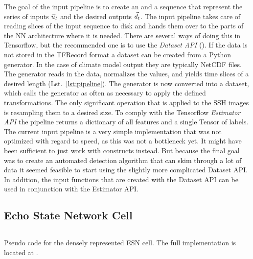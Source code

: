 The goal of the input pipeline is to create an  and a 
sequence that represent the series of inputs $\vec{u}_t$ and the desired outputs
$\vec{d}_t$.  The input pipeline takes care of reading slices of the input
sequence to disk and hands them over to the parts of the NN architecture where
it is needed.  There are several ways of doing this in Tensorflow, but the
recommended one is to use the \emph{Dataset API} ().  If
the data is not stored in the TFRecord format a dataset can be created from a
Python generator.  In the case of climate model output they are typically
NetCDF files.  The generator reads in the data, normalizes the values, and
yields time slices of a desired length (Lst.~\ref{lst:pipeline}).  The
generator is now converted into a dataset, which calls the generator as often
as necessary to apply the defined transformations.  The only significant
operation that is applied to the SSH images is resampling them to a desired
size.  To comply with the Tensorflow \emph{Estimator API} the pipeline returns
a dictionary of all features and a single Tensor of labels.  The current input
pipeline is a very simple implementation that was not optimized with regard
to speed, as this was not a bottleneck yet. It might have been sufficient to
just work with  constructs instead.  But because the final
goal was to create an automated detection algorithm that can skim through a lot
of data it seemed feasible to start using the slightly more complicated Dataset
API. In addition, the input functions that are created with the Dataset API can
be used in conjunction with the Estimator API.


\subsection{Echo State Network Cell}%
\label{sec:echo_state_network_cell}

\begin{listing}
  \inputminted{py}{pseudocode/esn_cell.py}
  \caption{Pseudo code for the densely represented ESN cell. The full implementation
  is located at .}
  \label{lst:esn_cell}
\end{listing}

